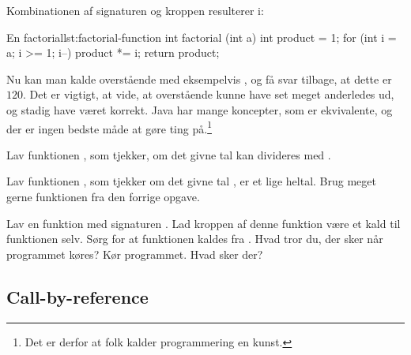 		Kombinationen af signaturen og kroppen resulterer i:

		\begin{JavaCode}{En \gls{factorial}}{lst:factorial-function}
			int factorial (int a) {
				int product = 1;
				for (int i = a; i >= 1; i--)
					product *= i;
				return product;
			}
		\end{JavaCode}

        Nu kan man kalde overstående med eksempelvis
        , og få svar tilbage, at dette er
        \(120\). Det er vigtigt, at vide, at overstående kunne have set
        meget anderledes ud, og stadig have været korrekt. Java har
        mange koncepter, som er ekvivalente, og der er ingen bedste
        måde at gøre ting på.\footnote{Det er derfor at folk kalder
        programmering en kunst.}

        \begin{exercise}
            Lav funktionen ,
            som tjekker, om det givne tal  kan
            divideres med .
        \end{exercise}

        \begin{exercise}
            Lav funktionen , som
            tjekker om det givne tal , er et lige
            heltal.  Brug meget gerne funktionen
             fra den forrige opgave.
        \end{exercise}

        \begin{exercise}
        	\label{ex:infinite-loop}
            Lav en funktion med signaturen . Lad
            kroppen af denne funktion være et kald til funktionen
            selv. Sørg for at funktionen kaldes fra .
            Hvad tror du, der sker når programmet køres? Kør
            programmet. Hvad sker der?
        \end{exercise}

    \subsection{Call-by-reference}


